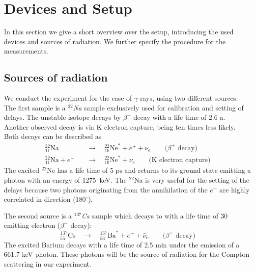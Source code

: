 \section{Devices and Setup}
In this section we give a short overview over the setup, introducing the used devices and sources of radiation. We
further specify the procedure for the measurements. 

\subsection{Sources of radiation}
\label{sec:sources}
We conduct the experiment for the case of $\gamma$-rays, using two different sources. The first sample is a 
\textit{$^{22}$Na}  sample exclusively used for calibration and setting of delays. The unstable isotope decays by 
$\beta^+$ decay with a life time of 2.6 a. Another observed decay is via K electron capture, being ten times less likely. 
Both decays can be described as
\begin{align}
_{11}^{22}\text{Na}        \quad &\rightarrow \quad _{10}^{22}\text{Ne}^* + e^+ + \nu_e	\qquad \text{($\beta^+$ decay)} \\
_{11}^{22}\text{Na} + e^-  \quad &\rightarrow \quad _{10}^{22}\text{Ne}^* + \nu_e  \qquad \text{(K electron capture)}
    \label{eq:22na_decay}
\end{align}
The excited $^{22}$Ne has a life time of 5 ps and returns to its ground state emitting a photon with an energy of 
1275~keV.\cite{lnhb} The $^{22}$Na is very useful for the setting of the delays because two photons originating from the 
annihilation of the $e^+$ are highly correlated in direction ($180^\circ$).\cite{ver}

The second source is a \textit{$^{137}$Cs} sample which decays to with a life time of 30 emitting electron 
($\beta^-$ decay):
\begin{equation}
_{55}^{137}\text{Cs} \quad \rightarrow \quad _{56}^{137}\text{Ba}^* + e^- + \bar{\nu}_e \qquad \text{($\beta^+$ decay)}
    \label{eq:137cs_decay}
\end{equation}
The excited Barium decays with a life time of 2.5 min under the emission of a 661.7 keV photon. These photons will be the 
source of radiation for the Compton scattering in our experiment.

